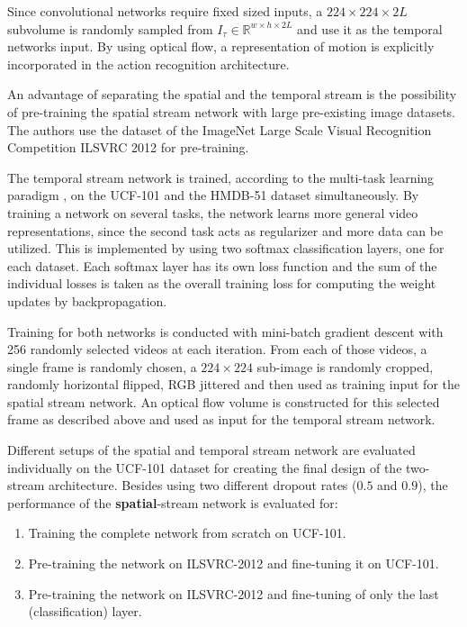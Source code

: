 Since convolutional networks require fixed sized inputs, a $224 \times 224 \times 2L$ subvolume is randomly sampled from $I_\tau \in \mathbb{R}^{w \times h \times 2L}$ and use it as the temporal networks input.
By using optical flow, a representation of motion is explicitly incorporated in the action recognition architecture.

An advantage of separating the spatial and the temporal stream is the possibility of pre-training the spatial stream network with large pre-existing image datasets.
The authors use the dataset of the ImageNet Large Scale Visual Recognition Competition ILSVRC 2012 \cite{russakovsky_imagenet_2015} for pre-training.

The temporal stream network is trained, according to the multi-task learning paradigm \cite{collobert_unified_2008}, on the UCF-101 and the HMDB-51 dataset simultaneously. 
By training a network on several tasks, the network learns more general video representations, since the second task acts as regularizer and more data can be utilized.
This is implemented by using two softmax classification layers, one for each dataset.
Each softmax layer has its own loss function and the sum of the individual losses is taken as the overall training loss for computing the weight updates by backpropagation.

Training for both networks is conducted with mini-batch gradient descent with 256 randomly selected videos at each iteration.
From each of those videos, a single frame is randomly chosen, a $224 \times 224$ sub-image is randomly cropped, randomly horizontal flipped, RGB jittered and then used as training input for the spatial stream network.
An optical flow volume is constructed for this selected frame as described above and used as input for the temporal stream network.



Different setups of the spatial and temporal stream network are evaluated individually on the UCF-101 dataset for creating the final design of the two-stream architecture.
Besides using two different dropout rates ($0.5$ and $0.9$), the performance of the \textbf{spatial}-stream network is evaluated for:
\begin{enumerate}
    \item Training the complete network from scratch on UCF-101.
    \item Pre-training the network on ILSVRC-2012 and fine-tuning it on UCF-101.
    \item Pre-training the network on ILSVRC-2012 and fine-tuning of only the last (classification) layer.
\end{enumerate}


